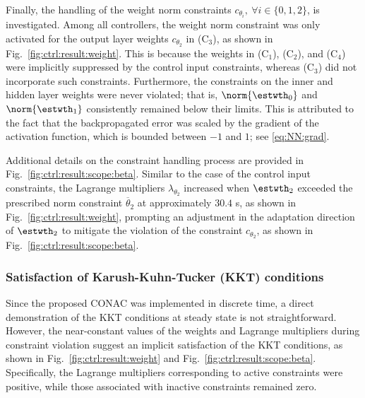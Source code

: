 \documentclass[journal]{IEEEtran}
\begin{document}
\hfill 

Finally, the handling of the weight norm constraints $c_{\theta_i},\ \forall i\in\{0,1,2\}$, is investigated. 
Among all controllers, the weight norm constraint was only activated for the output layer weights $c_{\theta_2}$ in (C$_3$), as shown in Fig.~\ref{fig:ctrl:result:weight}. 
This is because the weights in (C$_1$), (C$_2$), and (C$_4$) were implicitly suppressed by the control input constraints, whereas (C$_3$) did not incorporate such constraints.
Furthermore, the constraints on the inner and hidden layer weights were never violated; that is, $\norm{\estwth_0}$ and $\norm{\estwth_1}$ consistently remained below their limits.
This is attributed to the fact that the backpropagated error was scaled by the gradient of the activation function, which is bounded between $-1$ and $1$; see \eqref{eq:NN:grad}.

Additional details on the constraint handling process are provided in Fig.~\ref{fig:ctrl:result:scope:beta}. 
Similar to the case of the control input constraints, the Lagrange multipliers $\lambda_{\theta_2}$ increased when $\estwth_2$ exceeded the prescribed norm constraint 
$\overline\theta_2$ at approximately $30.4$ s, as shown in Fig.~\ref{fig:ctrl:result:weight}, prompting an adjustment in the adaptation direction of $\estwth_2$ to mitigate the violation of the constraint $c_{\theta_2}$, as shown in Fig.~\ref{fig:ctrl:result:scope:beta}.


\hfill

\subsubsection{Satisfaction of Karush-Kuhn-Tucker (KKT) conditions}

Since the proposed CONAC was implemented in discrete time, a direct demonstration of the KKT conditions at steady state is not straightforward. 
However, the near-constant values of the weights and Lagrange multipliers during constraint violation suggest an implicit satisfaction of the KKT conditions, as shown in Fig.~\ref{fig:ctrl:result:weight} and Fig.~\ref{fig:ctrl:result:scope:beta}.
Specifically, the Lagrange multipliers corresponding to active constraints were positive, while those associated with inactive constraints remained zero.
\end{document}
